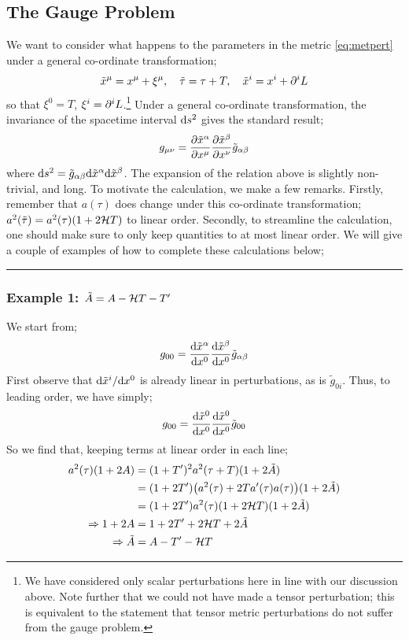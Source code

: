 \subsection{The Gauge Problem}
We want to consider what happens to the parameters in the metric \eqref{eq:metpert} under a general co-ordinate transformation;
\begin{equation}
\tilde{x}^{\mu} = x^{\mu} + \xi^\mu, \quad \tilde{\tau} = \tau + T, \quad \tilde{x}^i = x^i + \partial^i L
\end{equation}
so that $\xi^0 = T$, $\xi^i = \partial^i L$.\footnote{We have considered only scalar perturbations here in line with our discussion above. Note further that we could not have made a tensor perturbation; this is equivalent to the statement that tensor metric perturbations do not suffer from the gauge problem.} Under a general co-ordinate transformation, the invariance of the spacetime interval $\text{d} s^2$ gives the standard result;
\begin{equation}
g_{\mu\nu} = \frac{\partial \tilde{x}^\alpha}{\partial x^\mu}\frac{\partial \tilde{x}^\beta}{\partial x^\nu}\tilde{g}_{\alpha \beta}
\end{equation}
where $\text{d} s^2 = \tilde{g}_{\alpha \beta}\text{d} \tilde{x}^\alpha \text{d} \tilde{x}^\beta$. The expansion of the relation above is slightly non-trivial, and long. To motivate the calculation, we make a few remarks. Firstly, remember that $a(\tau)$ does change under this co-ordinate transformation; $a^2(\tilde{\tau}) = a^2(\tau)(1 + 2\mathcal{H} T)$ to linear order. Secondly, to streamline the calculation, one should make sure to only keep quantities to at most linear order. We will give a couple of examples of how to complete these calculations below;

\paraskip
\hrule
\subsubsection*{Example 1: $\tilde{A} = A - \mathcal{H} T - T^{\prime}$}
We start from;
\begin{equation*}
g_{00} = \frac{\text{d} \tilde{x}^\alpha}{\text{d} x^{0}}\frac{\text{d} \tilde{x}^{\beta}}{\text{d} x^{0}}\tilde{g}_{\alpha \beta}
\end{equation*}
First observe that $\text{d} \tilde{x}^{i}/\text{d} x^{0}$ is already linear in perturbations, as is $\tilde{g}_{0i}$. Thus, to leading order, we have simply;
\begin{equation*}
g_{00} = \frac{\text{d} \tilde{x}^0}{\text{d} x^{0}}\frac{\text{d} \tilde{x}^{0}}{\text{d} x^0}\tilde{g}_{00}
\end{equation*}
So we find that, keeping terms at linear order in each line;
\begin{align*}
a^2(\tau)(1 + 2A) &= (1 + T\pr)^2 a^2(\tau + T)(1 + 2\tilde{A}) \\
&= (1 + 2T\pr)\left(a^2(\tau) + 2T a\pr(\tau)a(\tau)\right)(1 + 2\tilde{A}) \\
&= (1 + 2T\pr)a^2(\tau)\left(1 + 2\hamilt T\right)(1 + 2\tilde{A}) \\
\Rightarrow 1 + 2A &= 1 + 2T\pr + 2\hamilt T + 2\tilde{A} \\
\Rightarrow \tilde{A} &= A - T\pr - \hamilt T
\end{align*}
